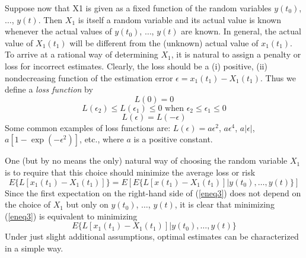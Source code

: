 \documentclass{article}
\begin{document}
Suppose now that X1 is given as a fixed function of the random variables $y(t_0)$, $\dotsc$, $y(t)$. Then $X_1$ is itself a random variable and its actual value is known whenever the actual values of $y(t_0)$, $\dotsc$, $y(t)$ are known. In general, the actual value of $X_1(t_1)$ will be different from the (unknown) actual value of $x_1(t_1)$. To arrive at a rational way of determining $X_1$, it is natural to assign a penalty or loss for incorrect estimates. Clearly, the loss should be a (i) positive, (ii) nondecreasing function of the estimation error $\epsilon = x_1(t_1)-X_1(t_1)$. Thus we define a \emph{loss function} by
\begin{equation*}
L(0)=0
\end{equation*}
\begin{equation}
\label{eneq2}
L(\epsilon_2) \le L(\epsilon_1) \le 0 \text{ when } \epsilon_2 \le \epsilon_1 \le 0
\end{equation}
\begin{equation*}
L(\epsilon)=L(-\epsilon)
\end{equation*}
Some common examples of loss functions are: $L(\epsilon) = a\epsilon^2$, $a\epsilon^4$, $a\vert \epsilon \vert$, $a[1 - \exp(-\epsilon^2)]$, etc., where $a$ is a positive constant.

One (but by no means the only) natural way of choosing the random variable $X_1$ is to require that this choice should minimize the average loss or risk
\begin{equation}
\label{eneq3}
E\{L[x_1(t_1)-X_1(t_1)]\}=E[E\{L[x(t_1)-X_1(t_1)] \vert y(t_0), \dotsc, y(t)\}]
\end{equation}
Since the first expectation on the right-hand side of (\ref{eneq3}) does not depend on the choice of $X_1$ but only on $y(t_0)$, $\dotsc$, $y(t)$, it is clear that minimizing (\ref{eneq3}) is equivalent to minimizing
\begin{equation}
\label{eneq4}
E\{L[x_1(t_1)-X_1(t_1)] \vert y(t_0), \dotsc, y(t)\}
\end{equation}
Under just slight additional assumptions, optimal estimates can be characterized in a simple way.
\end{document}
